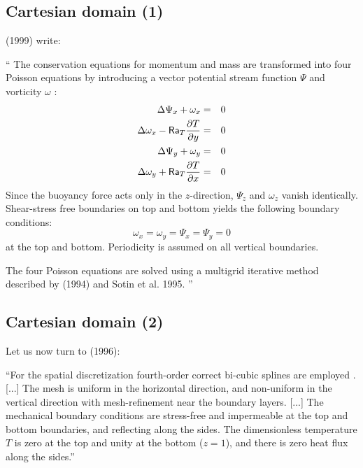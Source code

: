 \subsection{Cartesian domain (1)}
\textcite{sola99} (1999) write:
\begin{displayquote}
{\color{darkgray}
``
The conservation equations for momentum and mass are transformed into four Poisson equations by introducing a vector potential stream function $\Psi$ and vorticity $\omega$ \cite{tros90}:
\begin{eqnarray}
\Delta \Psi_x  + \omega_x &=& 0 \\
\Delta \omega_x - {\mathsf{Ra}}_T \frac{\partial T}{\partial y} &=& 0 \\
\Delta \Psi_y  + \omega_y &=& 0 \\
\Delta \omega_y + {\mathsf{Ra}}_T \frac{\partial T}{\partial x} &=& 0 
\end{eqnarray}
Since the buoyancy force acts only in the $z$-direction, $\Psi_z$ and 
$\omega_z$ vanish identically. Shear-stress free boundaries on top and bottom
yields the following boundary conditions:
\[
\omega_x=\omega_y = \Psi_x=\Psi_y=0 
\]
at the top and bottom. Periodicity is assumed on all vertical boundaries.

The four Poisson equations are solved using a multigrid iterative
method described by \textcite{past94} (1994) and Sotin et al. 1995.
''}
\end{displayquote}

\subsection{Cartesian domain (2)}

Let us now turn to \textcite{laym96} (1996): 
\begin{displayquote}
{\color{darkgray}
``For the spatial discretization fourth-order correct bi-cubic splines are employed \cite{mayu91}. [...] The mesh is uniform in the horizontal direction, and non-uniform
in the vertical direction with mesh-refinement near the boundary layers. [...]
The mechanical boundary conditions are stress-free and
impermeable at the top and bottom boundaries,
and reflecting along the sides. The dimensionless
temperature $T$ is zero at the top and unity at the
bottom ($z = 1$), and there is zero heat flux along the sides.''
}
\end{displayquote}

